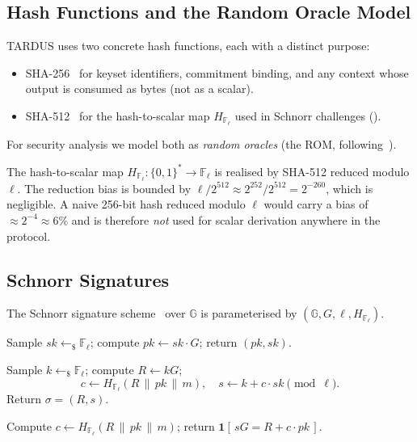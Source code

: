 \subsection{Hash Functions and the Random Oracle Model}
\label{sec:hash}

TARDUS uses two concrete hash functions, each with a distinct purpose:
\begin{itemize}[leftmargin=2em,itemsep=0pt]
  \item SHA-256~\cite{nist-sp800-185} for keyset identifiers, commitment binding, and any context whose output is consumed as bytes (not as a scalar).
  \item SHA-512~\cite{nist-sp800-185} for the hash-to-scalar map $H_{\mathbb{F}_\ell}$ used in Schnorr challenges ().
\end{itemize}

For security analysis we model both as \emph{random oracles} (the ROM, following~\cite{pointcheval-stern1996}).

The hash-to-scalar map $H_{\mathbb{F}_\ell} \colon \{0,1\}^* \to \mathbb{F}_\ell$ is realised by SHA-512 reduced modulo $\ell$. The reduction bias is bounded by $\ell / 2^{512} \approx 2^{252} / 2^{512} = 2^{-260}$, which is negligible. A naive 256-bit hash reduced modulo $\ell$ would carry a bias of $\approx 2^{-4} \approx 6\%$ and is therefore \emph{not} used for scalar derivation anywhere in the protocol.

\subsection{Schnorr Signatures}
\label{sec:schnorr}

The Schnorr signature scheme~\cite{schnorr1991} over $\mathbb{G}$ is parameterised by $(\mathbb{G}, G, \ell, H_{\mathbb{F}_\ell})$.

\begin{construction}
\label{con:schnorr}
\begin{description}[leftmargin=1.5em,style=nextline,itemsep=0.2em]
  \item[$\mathsf{KeyGen}(1^\lambda)$:] Sample $sk \leftarrow_\$ \mathbb{F}_\ell$; compute $pk \gets sk \cdot G$; return $(pk, sk)$.
  \item[$\mathsf{Sign}(sk, m)$:] Sample $k \leftarrow_\$ \mathbb{F}_\ell$; compute $R \gets kG$;
    \[ c \gets H_{\mathbb{F}_\ell}(R \,\|\, pk \,\|\, m), \quad s \gets k + c \cdot sk \pmod{\ell}. \]
    Return $\sigma = (R, s)$.
  \item[$\mathsf{Verify}(pk, m, \sigma = (R, s))$:] Compute $c \gets H_{\mathbb{F}_\ell}(R \,\|\, pk \,\|\, m)$; return $\mathbf{1}[\,sG = R + c \cdot pk\,]$.
\end{description}
\end{construction}


